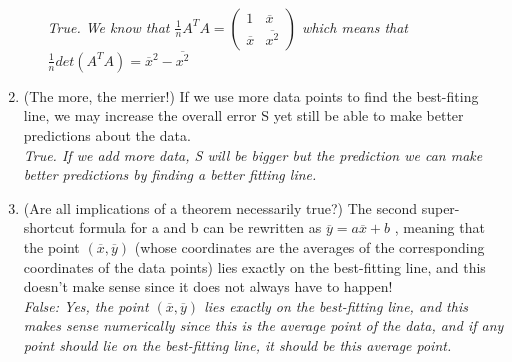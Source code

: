 \documentclass [11pt, letterpaper] {amsart}
\theoremstyle{plain}
\theoremstyle{definition}
\begin{document}
\begin{enumerate}
\begin{itemize}
\\
    \emph{True. We know that $\frac{1}{n}A^TA=\left(\begin{matrix}
                    1 & \overline{x}\\
                    \overline{x} & \overline{x^2}
                  \end{matrix}\right)$ which means that $\frac{1}{n}det(A^TA) =\overline{x}^2-\overline{x^2} $}\\
\end{itemize}                  
\item 
                        (The more, the merrier!) If we use more data points to find the best-fiting line, we may increase the overall error  S  yet still be able to make better predictions about the data.
\\
    \emph{True. If we add more data, S will be bigger but the prediction we can make better predictions by finding a better fitting line.}\\\item 
                        (Are all implications of a theorem necessarily true?) The second super-shortcut formula for a  and b  can be rewritten as $\overline{y}=a\overline{x}+b$ , meaning that the point  $(\overline{x},\overline{y})$  (whose coordinates are the averages of the corresponding coordinates of the data points) lies exactly on the best-fitting line, and this doesn't make sense since it does not always have to happen! 
\\
    \emph{False: Yes, the point $(\overline{x},\overline{y})$ lies exactly on the best-fitting line, and this makes sense numerically since this is the average point of the data, and if any point should lie on the best-fitting line, it should be this average point. }
                
    
    
\end{enumerate}
\end{document}
